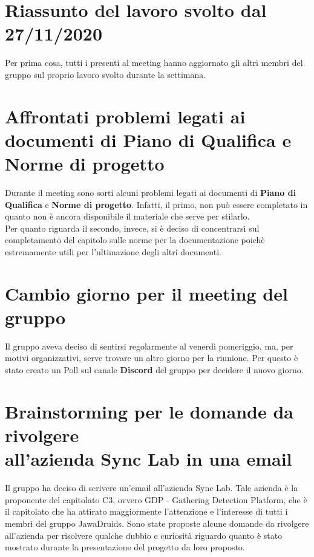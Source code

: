 \documentclass[a4paper,12pt]{report}
\begin{document}
	\chapter{Riassunto del lavoro svolto dal 27/11/2020}
	Per prima cosa, tutti i presenti al meeting hanno aggiornato gli altri membri del gruppo sul proprio lavoro svolto durante la settimana.
	
	\chapter{Affrontati problemi legati ai documenti di Piano di Qualifica e Norme di progetto}
	Durante il meeting sono sorti alcuni problemi legati ai documenti di \textbf{Piano di Qualifica} e \textbf{Norme di progetto}. Infatti, il primo, non può essere completato in quanto non è ancora disponibile il materiale che serve per stilarlo. \\
	Per quanto riguarda il secondo, invece, si è deciso di concentrarsi sul completamento del capitolo sulle norme per la documentazione poichè estremamente utili per l'ultimazione degli altri documenti.
	
	\chapter{Cambio giorno per il meeting del gruppo}
	Il gruppo aveva deciso di sentirsi regolarmente al venerdì pomeriggio, ma, per motivi organizzativi, serve trovare un altro giorno per la riunione. Per questo è stato creato un Poll sul canale \textbf{Discord} del gruppo per decidere il nuovo giorno.
	
	\chapter{Brainstorming per le domande da rivolgere \\all'azienda Sync Lab in una email} 
	Il gruppo ha deciso di scrivere un'email all'azienda Sync Lab. Tale azienda è la proponente del capitolato C3, ovvero GDP - Gathering Detection Platform, che è il capitolato che ha attirato maggiormente l'attenzione e l'interesse di tutti i membri del gruppo JawaDruids. Sono state proposte alcune domande da rivolgere all'azienda per risolvere qualche dubbio  e curiosità riguardo quanto è stato mostrato durante la presentazione del progetto da loro proposto. 
	
\end{document}
